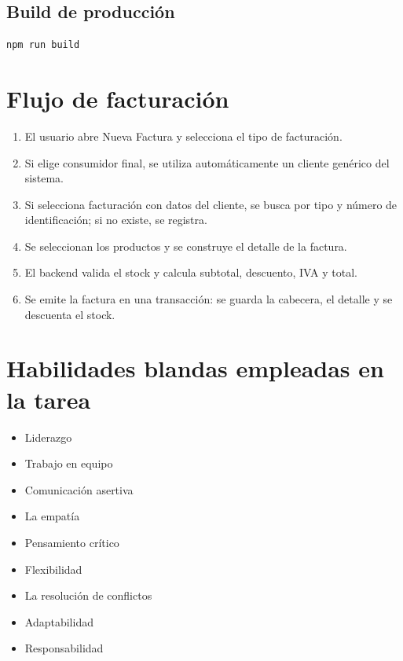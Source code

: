 \documentclass[12pt]{article}
\begin{document}
\subsection*{Build de producción}
\begin{verbatim}
npm run build
\end{verbatim}

\section{Flujo de facturación}

\begin{enumerate}
\item El usuario abre Nueva Factura y selecciona el tipo de facturación.
\item Si elige consumidor final, se utiliza automáticamente un cliente genérico del sistema.
\item Si selecciona facturación con datos del cliente, se busca por tipo y número de identificación; si no existe, se registra.
\item Se seleccionan los productos y se construye el detalle de la factura.
\item El backend valida el stock y calcula subtotal, descuento, IVA y total.
\item Se emite la factura en una transacción: se guarda la cabecera, el detalle y se descuenta el stock.
\end{enumerate}

\section{Habilidades blandas empleadas en la tarea}
\begin{itemize}
    \item[$\square$] Liderazgo
    \item[$\square$] Trabajo en equipo
    \item[$\boxtimes$] Comunicación asertiva
    \item[$\square$] La empatía
    \item[$\boxtimes$] Pensamiento crítico
    \item[$\boxtimes$] Flexibilidad
    \item[$\square$] La resolución de conflictos
    \item[$\boxtimes$] Adaptabilidad
    \item[$\boxtimes$] Responsabilidad
\end{itemize}
\end{document}
